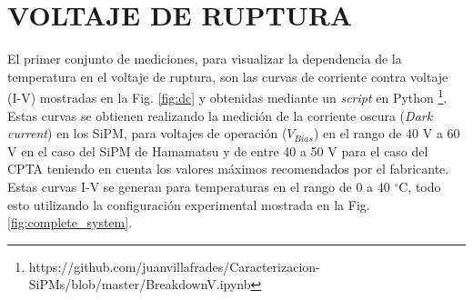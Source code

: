 \section{VOLTAJE DE RUPTURA}
El primer conjunto de mediciones, para visualizar la dependencia de la temperatura en el voltaje de ruptura, son las curvas de corriente contra voltaje (I-V) mostradas en la Fig. \ref{fig:dc} y obtenidas mediante un \textit{script} en Python \footnote{https://github.com/juanvillafrades/Caracterizacion-SiPMs/blob/master/BreakdownV.ipynb}. Estas curvas se obtienen realizando la medición de la corriente oscura (\textit{Dark current}) en los SiPM, para voltajes de operación ($V_{Bias}$) en el rango de 40 V a 60 V en el caso del SiPM de Hamamatsu y de entre 40 a 50 V para el caso del CPTA teniendo en cuenta los valores máximos recomendados por el fabricante. Estas curvas I-V se generan para temperaturas en el rango de 0 a 40 $^\circ$C, todo esto utilizando la configuración experimental mostrada en la Fig. \ref{fig:complete_system}.

